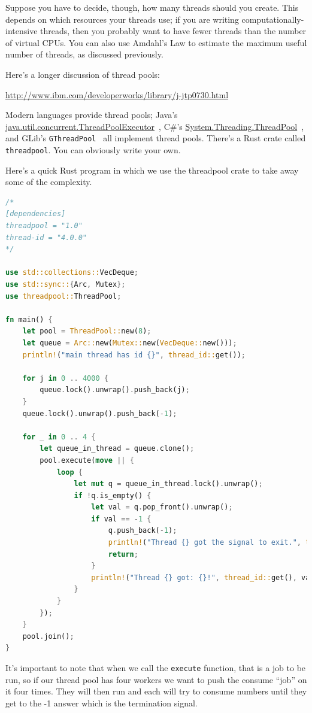 Suppose you have to decide, though, how many threads should you create.
This depends
on which resources your threads use; if you are writing
computationally-intensive threads, then you probably want to have
fewer threads than the number of virtual CPUs. You can also use
Amdahl's Law to estimate the maximum useful number of threads, as
discussed previously.

Here's a longer discussion of thread pools:

\begin{center}
\url{http://www.ibm.com/developerworks/library/j-jtp0730.html}
\end{center}

Modern languages provide thread pools; Java's
\url{java.util.concurrent.ThreadPoolExecutor}~\cite{java:threadpoolexecutor}, C\#'s
\url{System.Threading.ThreadPool}~\cite{csharp:threadpool}, and GLib's {\tt GThreadPool}~\cite{gnome:threadpool} all implement thread pools. There's a Rust crate called \texttt{threadpool}. You can obviously write your own.

Here's a quick Rust program in which we use the threadpool crate to take away some of the complexity.
\begin{lstlisting}[language=Rust]
/*
[dependencies]
threadpool = "1.0"
thread-id = "4.0.0"
*/

use std::collections::VecDeque;
use std::sync::{Arc, Mutex};
use threadpool::ThreadPool;

fn main() {
    let pool = ThreadPool::new(8);
    let queue = Arc::new(Mutex::new(VecDeque::new()));
    println!("main thread has id {}", thread_id::get());

    for j in 0 .. 4000 {
        queue.lock().unwrap().push_back(j);
    }
    queue.lock().unwrap().push_back(-1);

    for _ in 0 .. 4 {
        let queue_in_thread = queue.clone();
        pool.execute(move || {
            loop {
                let mut q = queue_in_thread.lock().unwrap();
                if !q.is_empty() {
                    let val = q.pop_front().unwrap();
                    if val == -1 {
                        q.push_back(-1);
                        println!("Thread {} got the signal to exit.", thread_id::get());
                        return;
                    }
                    println!("Thread {} got: {}!", thread_id::get(), val);
                }
            }
        });
    }
    pool.join();
}
\end{lstlisting}

It's important to note that when we call the \texttt{execute} function, that is a job to be run, so if our thread pool has four workers we want to push the consume ``job'' on it four times. They will then run and each will try to consume numbers until they get to the -1 answer which is the termination signal.

